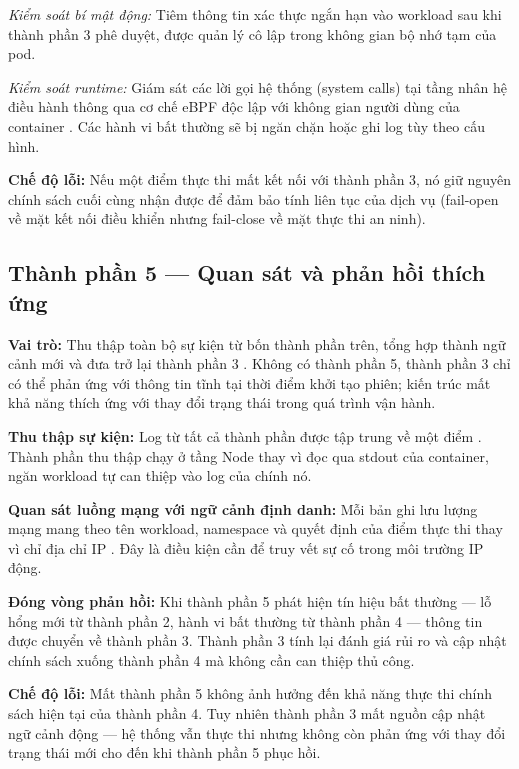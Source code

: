 \textit{Kiểm soát bí mật động:} Tiêm thông tin xác thực ngắn hạn vào workload sau khi thành phần 3 phê duyệt, được quản lý cô lập trong không gian bộ nhớ tạm của pod.

\textit{Kiểm soát runtime:} Giám sát các lời gọi hệ thống (system calls) tại tầng nhân hệ điều hành thông qua cơ chế eBPF độc lập với không gian người dùng của container \parencite{ebpf_io,tetragon_docs}. Các hành vi bất thường sẽ bị ngăn chặn hoặc ghi log tùy theo cấu hình.

\textbf{Chế độ lỗi:} Nếu một điểm thực thi mất kết nối với thành phần 3, nó giữ nguyên chính sách cuối cùng nhận được để đảm bảo tính liên tục của dịch vụ (fail-open về mặt kết nối điều khiển nhưng fail-close về mặt thực thi an ninh).


\subsection{Thành phần 5 — Quan sát và phản hồi thích ứng}

\textbf{Vai trò:} Thu thập toàn bộ sự kiện từ bốn thành phần trên, tổng hợp thành ngữ cảnh mới và đưa trở lại thành phần 3 \parencite{nist800137,nist800204c_devsecops_microservices}. Không có thành phần 5, thành phần 3 chỉ có thể phản ứng với thông tin tĩnh tại thời điểm khởi tạo phiên; kiến trúc mất khả năng thích ứng với thay đổi trạng thái trong quá trình vận hành.

\textbf{Thu thập sự kiện:} Log từ tất cả thành phần được tập trung về một điểm \parencite{elk_docs,fluent_bit_docs}. Thành phần thu thập chạy ở tầng Node thay vì đọc qua stdout của container, ngăn workload tự can thiệp vào log của chính nó.

\textbf{Quan sát luồng mạng với ngữ cảnh định danh:} Mỗi bản ghi lưu lượng mạng mang theo tên workload, namespace và quyết định của điểm thực thi thay vì chỉ địa chỉ IP \parencite{hubble_docs,cilium_docs}. Đây là điều kiện cần để truy vết sự cố trong môi trường IP động.

\textbf{Đóng vòng phản hồi:} Khi thành phần 5 phát hiện tín hiệu bất thường --- lỗ hổng mới từ thành phần 2, hành vi bất thường từ thành phần 4 --- thông tin được chuyển về thành phần 3. Thành phần 3 tính lại đánh giá rủi ro và cập nhật chính sách xuống thành phần 4 mà không cần can thiệp thủ công.

\textbf{Chế độ lỗi:} Mất thành phần 5 không ảnh hưởng đến khả năng thực thi chính sách hiện tại của thành phần 4. Tuy nhiên thành phần 3 mất nguồn cập nhật ngữ cảnh động --- hệ thống vẫn thực thi nhưng không còn phản ứng với thay đổi trạng thái mới cho đến khi thành phần 5 phục hồi.


